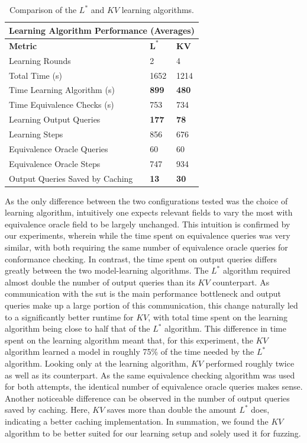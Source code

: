 \begin{table}[h]
	\centering
	\begin{tabular}{ |p{6.5cm}||p{1cm}|p{1cm}|  }
		\hline
		\multicolumn{3}{|c|}{\textbf{Learning Algorithm Performance (Averages)}} \\
		\hline
		\textbf{Metric} & $\mathbf{L^*}$ & $\mathbf{KV}$ \\
		\hline
		Learning Rounds							&	2				&	4 				\\
		Total Time (s)							&   1652			& 	1214   			\\
		Time Learning Algorithm	(s)				&	\textbf{899}	& 	\textbf{480}	\\
		Time Equivalence Checks (s)				& 	753				& 	734			\\
		Learning Output Queries 				&   \textbf{177}	& 	\textbf{78}		\\
		Learning Steps							& 	856	  			& 	676   			\\
		Equivalence Oracle Queries				& 	60  			&  	60				\\
		Equivalence Oracle Steps				& 	747  			&  	934				\\
		Output Queries Saved by Caching			& 	\textbf{13}		&  	\textbf{30}				\\
		\hline
	\end{tabular}
	\caption{Comparison of the $L^*$ and $KV$ learning algorithms.}
	\label{tab:compkvlstar}
\end{table}

As the only difference between the two configurations tested was the choice of learning algorithm, intuitively one expects relevant fields to vary the most with equivalence oracle field to be largely unchanged. This intuition is confirmed by our experiments, wherein while the time spent on equivalence queries was very similar, with both requiring the same number of equivalence oracle queries for conformance checking. In contrast, the time spent on output queries differs greatly between the two model-learning algorithms. The $L^*$ algorithm required almost double the number of output queries than its $KV$ counterpart. As communication with the \ac{sut} is the main performance bottleneck and output queries make up a large portion of this communication, this change naturally led to a significantly better runtime for $KV$, with total time spent on the learning algorithm being close to half that of the $L^*$ algorithm. This difference in time spent on the learning algorithm meant that, for this experiment, the $KV$ algorithm learned a model in roughly 75\% of the time needed by the $L^*$ algorithm. Looking only at the learning algorithm, $KV$ performed roughly twice as well as its counterpart. As the same equivalence checking algorithm was used for both attempts, the identical number of equivalence oracle queries makes sense. Another noticeable difference can be observed in the number of output queries saved by caching. Here, $KV$ saves more than double the amount $L^*$ does, indicating a better caching implementation. In summation, we found the $KV$ algorithm to be better suited for our learning setup and solely used it for fuzzing. \\\\

